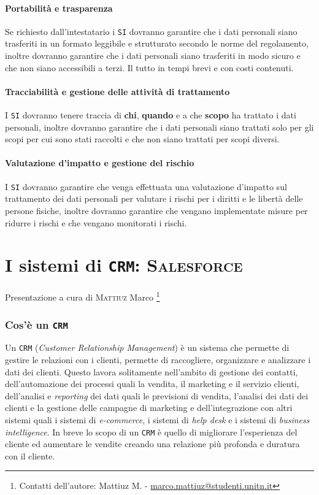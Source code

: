 {            \paragraph{Portabilità e trasparenza} Se richiesto dall'intestatario i \texttt{SI} dovranno garantire che i dati personali siano trasferiti in un formato leggibile e strutturato secondo le norme del regolamento, inoltre dovranno garantire che i dati personali siano trasferiti in modo sicuro e che non siano accessibili a terzi. Il tutto in tempi brevi e con costi contenuti.
            \paragraph{Tracciabilità e gestione delle attività di trattamento} I \texttt{SI} dovranno tenere traccia di \textbf{chi}, \textbf{quando} e a che \textbf{scopo} ha trattato i dati personali, inoltre dovranno garantire che i dati personali siano trattati solo per gli scopi per cui sono stati raccolti e che non siano trattati per scopi diversi.
        
        \paragraph{Valutazione d'impatto e gestione del rischio} I \texttt{SI} dovranno garantire che venga effettuata una valutazione d'impatto sul trattamento dei dati personali per valutare i rischi per i diritti e le libertà delle persone fisiche, inoltre dovranno garantire che vengano implementate misure per ridurre i rischi e che vengano monitorati i rischi.
\section{I sistemi di \texttt{CRM}: \textsc{Salesforce}}
{\footnotesize Presentazione a cura di \textsc{Mattiuz} Marco \footnote{Contatti dell'autore: Mattiuz M. - \href{mailto:marco.mattiuz@studenti.unitn.it}{marco.mattiuz@studenti.unitn.it}}
    \subsubsection{Cos'è un \texttt{CRM}}
        Un \texttt{CRM} (\textit{Customer Relationship Management}) è un sistema che permette di gestire le relazioni con i clienti, permette di raccogliere, organizzare e analizzare i dati dei clienti. Questo lavora solitamente nell'ambito di gestione dei contatti, dell'automazione dei processi quali la vendita, il marketing e il servizio clienti, dell'analisi e \textit{reporting} dei dati quali le previsioni di vendita, l'analisi dei dati dei clienti e la gestione delle campagne di marketing e dell'integrazione con altri sistemi quali i sistemi di \textit{e-commerce}, i sistemi di \textit{help desk} e i sistemi di \textit{business intelligence}.\newline
        In breve lo scopo di un \texttt{CRM} è quello di migliorare l'esperienza del cliente ed aumentare le vendite creando una relazione più profonda e duratura con il cliente.
}}
